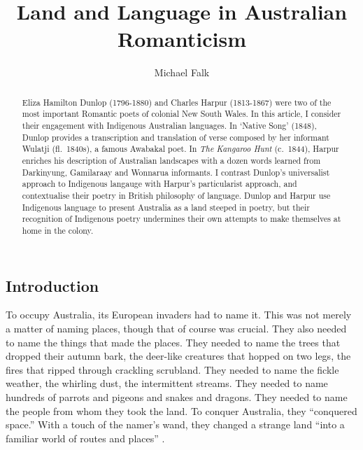 \documentclass[
  Crown,
  times,
  sageh]{sagej}
\title{Land and Language in Australian Romanticism}
\author{Michael Falk\affilnum{1}}
\affiliation{
    \affilnum{1} University of Melbourne \\
  }
\renewcommand*\contentsname{Table of contents}
\newcommand\contentsname{Table of contents}
\begin{document}
\maketitle


\maketitle
\begin{abstract}
Eliza Hamilton Dunlop (1796-1880) and Charles Harpur (1813-1867) were
two of the most important Romantic poets of colonial New South Wales. In
this article, I consider their engagement with Indigenous Australian
languages. In `Native Song' (1848), Dunlop provides a transcription and
translation of verse composed by her informant Wulatji (fl.~1840s), a
famous Awabakal poet. In \emph{The Kangaroo Hunt} (c.~1844), Harpur
enriches his description of Australian landscapes with a dozen words
learned from Darkinyung, Gamilaraay and Wonnarua informants. I contrast
Dunlop's universalist approach to Indigenous langauge with Harpur's
particularist approach, and contextualise their poetry in British
philosophy of language. Dunlop and Harpur use Indigenous language to
present Australia as a land steeped in poetry, but their recognition of
Indigenous poetry undermines their own attempts to make themselves at
home in the colony.
\end{abstract}

\renewcommand*\contentsname{Table of contents}
{
\hypersetup{linkcolor=}
\setcounter{tocdepth}{3}
\tableofcontents
}
\subsection{Introduction}\label{introduction}

To occupy Australia, its European invaders had to name it. This was not
merely a matter of naming places, though that of course was crucial.
They also needed to name the things that made the places. They needed to
name the trees that dropped their autumn bark, the deer-like creatures
that hopped on two legs, the fires that ripped through crackling
scrubland. They needed to name the fickle weather, the whirling dust,
the intermittent streams. They needed to name hundreds of parrots and
pigeons and snakes and dragons. They needed to name the people from whom
they took the land. To conquer Australia, they ``conquered space.'' With
a touch of the namer's wand, they changed a strange land ``into a
familiar world of routes and places'' \citep[83]{tuan_space_1977}.
\end{document}
